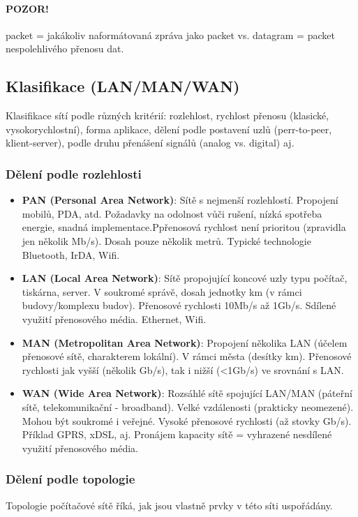 \documentclass[10pt,a4paper]{article}
\begin{document}
\paragraph{POZOR!} packet = jakákoliv naformátovaná zpráva jako packet vs. datagram = packet nespolehlivého přenosu dat.
\subsection{Klasifikace (LAN/MAN/WAN)}
Klasifikace sítí podle různých kritérií: rozlehlost, rychlost přenosu (klasické, vysokorychlostní), forma aplikace, dělení podle postavení uzlů (perr-to-peer, klient-server), podle druhu přenášení signálů (analog vs. digital) aj.
\subsubsection{Dělení podle rozlehlosti}
\begin{itemize}
	\item \textbf{PAN (Personal Area Network)}: Sítě s nejmenší rozlehlostí. Propojení mobilů, PDA, atd. Požadavky na odolnost vůči rušení, nízká spotřeba energie, snadná implementace.Ppřenosová rychlost není prioritou (zpravidla jen několik Mb/s). Dosah pouze několik metrů. Typické technologie Bluetooth, IrDA, Wifi.
	\item \textbf{LAN (Local Area Network)}: Sítě propojující koncové uzly typu počítač, tiskárna, server. V soukromé správě, dosah jednotky km (v rámci budovy/komplexu budov). Přenosové rychlosti 10Mb/s až 1Gb/s. Sdílené využití přenosového média. Ethernet, Wifi.
	\item \textbf{MAN (Metropolitan Area Network)}: Propojení několika LAN (účelem přenosové sítě, charakterem lokální). V rámci města (desítky km). Přenosové rychlosti jak vyšší (několik Gb/s), tak i nižší (<1Gb/s) ve srovnání s LAN.
	\item \textbf{WAN (Wide Area Network)}: Rozsáhlé sítě spojující LAN/MAN (páteřní sítě, telekomunikační - broadband). Velké vzdálenosti (prakticky neomezené). Mohou být soukromé i veřejné. Vysoké přenosové rychlosti (až stovky Gb/s). Příklad GPRS, xDSL, aj. Pronájem kapacity sítě = vyhrazené nesdílené využití přenosového média.
\end{itemize}
\subsubsection{Dělení podle topologie}
Topologie počítačové sítě říká, jak jsou vlastně prvky v této síti uspořádány.
\end{document}
